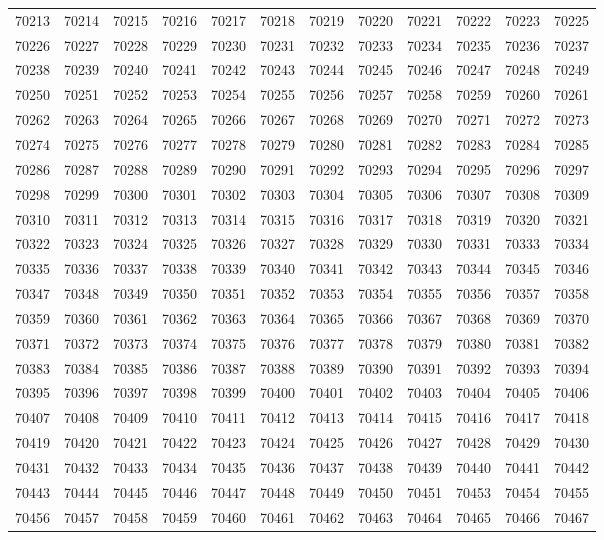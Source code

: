 \begin{center}
\begin{longtable}{llllllllllll}
70213 &70214 &70215 &70216 &70217 &70218 &70219 &70220 &70221 &70222 &70223 &70225 \\
70226 &70227 &70228 &70229 &70230 &70231 &70232 &70233 &70234 &70235 &70236 &70237 \\
70238 &70239 &70240 &70241 &70242 &70243 &70244 &70245 &70246 &70247 &70248 &70249 \\
70250 &70251 &70252 &70253 &70254 &70255 &70256 &70257 &70258 &70259 &70260 &70261 \\
70262 &70263 &70264 &70265 &70266 &70267 &70268 &70269 &70270 &70271 &70272 &70273 \\
70274 &70275 &70276 &70277 &70278 &70279 &70280 &70281 &70282 &70283 &70284 &70285 \\
70286 &70287 &70288 &70289 &70290 &70291 &70292 &70293 &70294 &70295 &70296 &70297 \\
70298 &70299 &70300 &70301 &70302 &70303 &70304 &70305 &70306 &70307 &70308 &70309 \\
70310 &70311 &70312 &70313 &70314 &70315 &70316 &70317 &70318 &70319 &70320 &70321 \\
70322 &70323 &70324 &70325 &70326 &70327 &70328 &70329 &70330 &70331 &70333 &70334 \\
70335 &70336 &70337 &70338 &70339 &70340 &70341 &70342 &70343 &70344 &70345 &70346 \\
70347 &70348 &70349 &70350 &70351 &70352 &70353 &70354 &70355 &70356 &70357 &70358 \\
70359 &70360 &70361 &70362 &70363 &70364 &70365 &70366 &70367 &70368 &70369 &70370 \\
70371 &70372 &70373 &70374 &70375 &70376 &70377 &70378 &70379 &70380 &70381 &70382 \\
70383 &70384 &70385 &70386 &70387 &70388 &70389 &70390 &70391 &70392 &70393 &70394 \\
70395 &70396 &70397 &70398 &70399 &70400 &70401 &70402 &70403 &70404 &70405 &70406 \\
70407 &70408 &70409 &70410 &70411 &70412 &70413 &70414 &70415 &70416 &70417 &70418 \\
70419 &70420 &70421 &70422 &70423 &70424 &70425 &70426 &70427 &70428 &70429 &70430 \\
70431 &70432 &70433 &70434 &70435 &70436 &70437 &70438 &70439 &70440 &70441 &70442 \\
70443 &70444 &70445 &70446 &70447 &70448 &70449 &70450 &70451 &70453 &70454 &70455 \\
70456 &70457 &70458 &70459 &70460 &70461 &70462 &70463 &70464 &70465 &70466 &70467 \\

\end{longtable}
\end{center}
